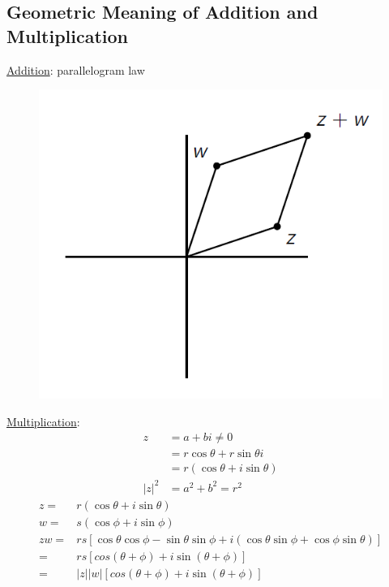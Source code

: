 \documentclass[11pt,a4paper]{article}
\begin{document}
\subsection{Geometric Meaning of Addition and Multiplication}
\underline{Addition}: parallelogram law
\begin{center}\begin{figure}[htbp]
    \centering
    \includegraphics[scale=0.7]{Complex addition.png}
\end{figure}\end{center}
\underline{Multiplication}:
\begin{equation}
    \begin{aligned}
        z&=a+bi\neq0\\
        &=r \cos\theta+r \sin\theta i\\
        &=r (\cos\theta+i\sin\theta)\\
        |z|^2&=a^2+b^2=r^2
    \end{aligned}
    \nonumber
\end{equation}
\begin{equation}
    \begin{aligned}
        z=&r (\cos\theta+i\sin\theta)\\
        w=&s (\cos\phi+i\sin\phi)\\
        zw=&rs[\cos\theta\cos\phi-\sin\theta\sin\phi+i(\cos\theta\sin\phi+\cos\phi\sin\theta)]\\
        =&rs[cos(\theta+\phi)+i\sin(\theta+\phi)]\\
        =&|z||w|[cos(\theta+\phi)+i\sin(\theta+\phi)]
    \end{aligned}
    \nonumber
\end{equation}
\end{document}
